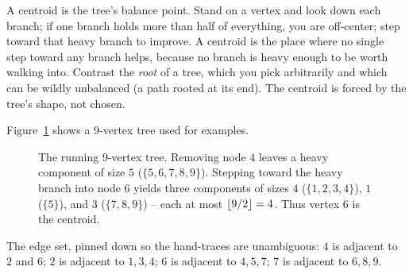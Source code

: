 \begin{intuitionbox}
A centroid is the tree's balance point. Stand on a vertex and look down each
branch; if one branch holds more than half of everything, you are off-center;
step toward that heavy branch to improve. A centroid is the place where no
single step toward any branch helps, because no branch is heavy enough to be worth
walking into. Contrast the \emph{root} of a tree, which you pick arbitrarily and
which can be wildly unbalanced (a path rooted at its end). The centroid is forced
by the tree's shape, not chosen.
\end{intuitionbox}

Figure~\ref{ch20:fig-running-tree} shows a 9-vertex tree used for examples.

\begin{figure}[H]
\centering
{}
\caption{The running 9-vertex tree. Removing node $4$ leaves a heavy component of size $5$ ($\{5,6,7,8,9\}$). Stepping toward the heavy branch into node $6$ yields three components of sizes $4$ ($\{1,2,3,4\}$), $1$ ($\{5\}$), and $3$ ($\{7,8,9\}$) -- each at most $\lfloor9/2\rfloor=4$. Thus vertex $6$ is the centroid.}
\label{ch20:fig-running-tree}
\end{figure}

The edge set, pinned down so the hand-traces are unambiguous: $4$ is adjacent to
$2$ and $6$; $2$ is adjacent to $1,3,4$; $6$ is adjacent to $4,5,7$; $7$ is
adjacent to $6,8,9$.

